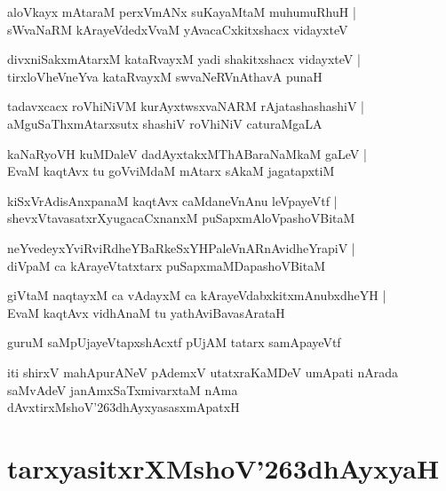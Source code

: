 \documentclass[twoside,12pt,openright]{book}
\def\S{\char'263}
\newcounter{shloka}[chapter]
\begin{document}
\begin{shloka}%
aloVkayx mAtaraM perxVmANx suKayaMtaM muhumuRhuH |\\
sWvaNaRM kArayeVdedxVvaM yAvacaCxkitxshacx vidayxteV 
\end{shloka}

\begin{shloka}%
divxniSakxmAtarxM kataRvayxM yadi shakitxshacx vidayxteV |\\
tirxloVheVneYva kataRvayxM swvaNeRVnAthavA punaH
\end{shloka}

\begin{shloka}%
tadavxcacx roVhiNiVM kurAyxtwsxvaNARM rAjatashashashiV |\\
aMguSaThxmAtarxsutx shashiV roVhiNiV caturaMgaLA
\end{shloka}

\begin{shloka}%
kaNaRyoVH kuMDaleV dadAyxtakxMThABaraNaMkaM gaLeV |\\
EvaM kaqtAvx tu goVviMdaM mAtarx sAkaM jagatapxtiM 
\end{shloka}

\begin{shloka}%
kiSxVrAdisAnxpanaM kaqtAvx caMdaneVnAnu leVpayeVtf |\\
shevxVtavasatxrXyugacaCxnanxM puSapxmAloVpashoVBitaM 
\end{shloka}

\begin{shloka}%
neYvedeyxYviRviRdheYBaRkeSxYHPaleVnARnAvidheYrapiV |\\
diVpaM ca kArayeVtatxtarx puSapxmaMDapashoVBitaM 
\end{shloka}

\begin{shloka}%
giVtaM naqtayxM ca vAdayxM ca kArayeVdabxkitxmAnubxdheYH |\\
EvaM kaqtAvx vidhAnaM tu yathAviBavasArataH
\end{shloka}

\begin{shloka}%
guruM saMpUjayeVtapxshAcxtf pUjAM tatarx samApayeVtf
\end{shloka}

\begin{center}
iti shirxV mahApurANeV pAdemxV utatxraKaMDeV umApati nArada saMvAdeV  
janAmxSaTxmivarxtaM nAma dAvxtirxMshoV\S dhAyxyasasxmApatxH
\end{center}

\chapter{tarxyasitxrXMshoV\S dhAyxyaH}
\end{document}
